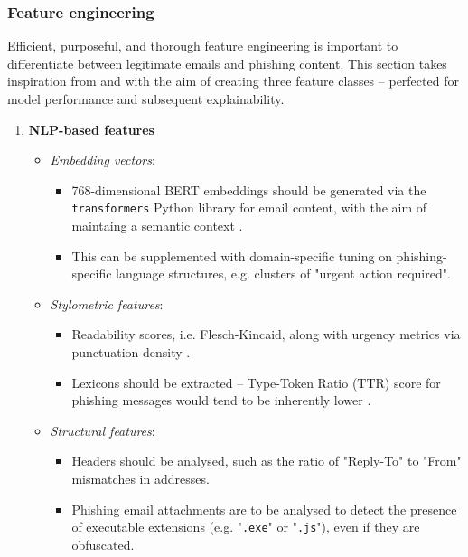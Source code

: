 
\subsubsection*{Feature engineering}
Efficient, purposeful, and thorough feature engineering is important to differentiate between legitimate emails and phishing content. This section takes inspiration from \citep{do2024integrated} and \citep{hamid2013using} with the aim of creating three feature classes -- perfected for model performance and subsequent explainability.

\begin{enumerate}
  \item \textbf{NLP-based features}
  \begin{itemize}
    \item \textit{Embedding vectors}:
    \begin{itemize}
      \item 768-dimensional BERT embeddings should be generated via the \texttt{transformers} Python library for email content, with the aim of maintaing a semantic context \citep{shirazi2022towards}.
      \item This can be supplemented with domain-specific tuning on phishing-specific language structures, e.g. clusters of "urgent action required".
    \end{itemize}
    \item \textit{Stylometric features}:
    \begin{itemize}
      \item Readability scores, i.e. Flesch-Kincaid, along with urgency metrics via punctuation density \citep{greco2023explaining}.
      \item Lexicons should be extracted -- Type-Token Ratio (TTR) score for phishing messages would tend to be inherently lower \citep{anderson2015polymorphic}.
    \end{itemize}
    \item \textit{Structural features}:
    \begin{itemize}
      \item Headers should be analysed, such as the ratio of "Reply-To" to "From" mismatches in addresses. 
      \item Phishing email attachments are to be analysed to detect the presence of executable extensions (e.g. "\texttt{.exe}" or "\texttt{.js}"), even if they are obfuscated.

\end{itemize}
\end{itemize}
\end{enumerate}
